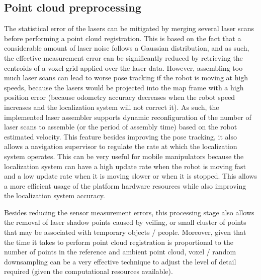 \subsection{Point cloud preprocessing}

The statistical error of the lasers can be mitigated by merging several laser scans before performing a point cloud registration. This is based on the fact that a considerable amount of laser noise follows a Gaussian distribution, and as such, the effective measurement error can be significantly reduced by retrieving the centroids of a voxel grid applied over the laser data. However, assembling too much laser scans can lead to worse pose tracking if the robot is moving at high speeds, because the lasers would be projected into the map frame with a high position error (because odometry accuracy decreases when the robot speed increases and the localization system will not correct it). As such, the implemented laser assembler supports dynamic reconfiguration of the number of laser scans to assemble (or the period of assembly time) based on the robot estimated velocity. This feature besides improving the pose tracking, it also allows a navigation supervisor to regulate the rate at which the localization system operates. This can be very useful for mobile manipulators because the localization system can have a high update rate when the robot is moving fast and a low update rate when it is moving slower or when it is stopped. This allows a more efficient usage of the platform hardware resources while also improving the localization system accuracy.

Besides reducing the sensor measurement errors, this processing stage also allows the removal of laser shadow points caused by veiling, or small cluster of points that may be associated with temporary objects / people. Moreover, given that the time it takes to perform point cloud registration is proportional to the number of points in the reference and ambient point cloud, voxel / random downsampling can be a very effective technique to adjust the level of detail required (given the computational resources available).



\subsection{}

